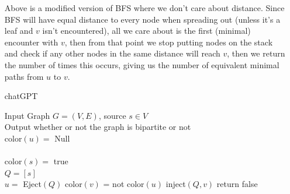 \documentclass[12pt, letterpaper]{article}
\begin{document}
\begin{enumerate}
\begin{algorithmic}
	
	\end{algorithmic}
	Above is a modified version of BFS where we don't care 
	about distance.  Since BFS will have equal distance to every node
	when spreading out (unless it's a leaf and $v$ isn't encountered), all we care about is the first (minimal) 
	encounter with $v$, then from that point we stop putting 
	nodes on the stack and check if any other nodes in the same 
	distance will reach $v$, then we return the number of times 
	this occurs, giving us the number of equivalent minimal paths 
	from $u$ to $v$.  
	\item[chatGPT]
	\begin{algorithmic}
	Input Graph $G = (V,E)$, source $s \in V$\\
	Output whether or not the graph is bipartite or not\\
		\State color$(u) = $ Null\\
	\EndFor\\
	color$(s) = $ true\\
	$Q = [s]$\\
	\State $u = $ Eject$(Q)$
			\State color$(v)$ = not color$(u)$
			\State inject$(Q,v)$
			\State return false
		\EndIf
	\EndFor
	\EndWhile
	
	
	\end{algorithmic}
\end{enumerate}
\end{document}
